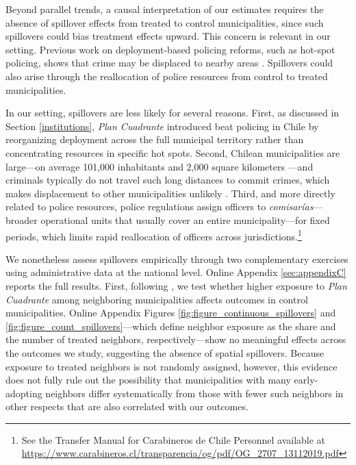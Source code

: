
Beyond parallel trends, a causal interpretation of our estimates requires the absence of spillover effects from treated to control municipalities, since such spillovers could bias treatment effects upward. This concern is relevant in our setting. Previous work on deployment-based policing reforms, such as hot-spot policing, shows that crime may be displaced to nearby areas \citep{Blattman_Tobon_JEEA}. Spillovers could also arise through the reallocation of police resources from control to treated municipalities.

In our setting, spillovers are less likely for several reasons. First, as discussed in Section \ref{institutions}, \emph{Plan Cuadrante} introduced beat policing in Chile by reorganizing deployment across the full municipal territory rather than concentrating resources in specific hot spots. Second, Chilean municipalities are large---on average 101,000 inhabitants and 2,000 square kilometers \citep{SINIM}---and criminals typically do not travel such long distances to commit crimes, which makes displacement to other municipalities unlikely \citep{Langella}. Third, and more directly related to police resources, police regulations assign officers to \emph{comisar\'ias}---broader operational units that usually cover an entire municipality---for fixed periods, which limits rapid reallocation of officers across jurisdictions.\footnote{See the Transfer Manual for Carabineros de Chile Personnel available at \url{https://www.carabineros.cl/transparencia/og/pdf/OG_2707_13112019.pdf}}

We nonetheless assess spillovers empirically through two complementary exercises using administrative data at the national level. Online Appendix \ref{sec:appendixC} reports the full results. First, following \citet{crepon2013}, we test whether higher exposure to \emph{Plan Cuadrante} among neighboring municipalities affects outcomes in control municipalities. Online Appendix Figures \ref{fig:figure_continuous_spillovers} and \ref{fig:figure_count_spillovers}---which define neighbor exposure as the share and the number of treated neighbors, respectively---show no meaningful effects across the outcomes we study, suggesting the absence of spatial spillovers. Because exposure to treated neighbors is not randomly assigned, however, this evidence does not fully rule out the possibility that municipalities with many early-adopting neighbors differ systematically from those with fewer such neighbors in other respects that are also correlated with our outcomes.

